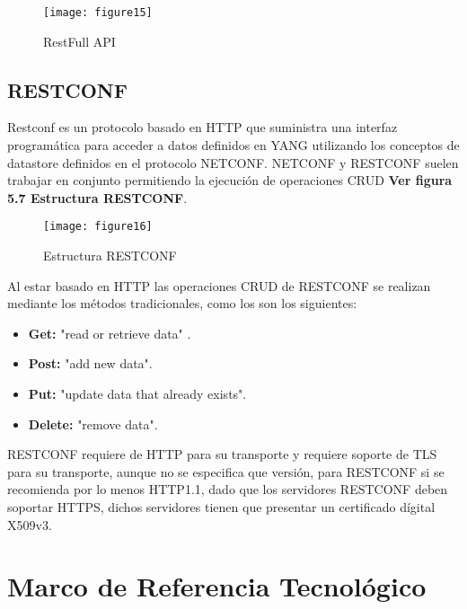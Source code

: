 \begin{figure}[htbp]
  \centering
    {\texttt{[image: figure15]}}%
  \caption{RestFull API}
  \label{fig:fig2subfig}
\end{figure}

\subsection{RESTCONF}
\label{sec:RESTCONF}

Restconf es un protocolo basado en HTTP que suministra una interfaz programática para acceder a datos definidos en YANG utilizando los conceptos de datastore definidos en el protocolo NETCONF.
NETCONF y RESTCONF suelen trabajar en conjunto permitiendo la ejecución de operaciones CRUD \textbf{Ver figura 5.7 Estructura RESTCONF}.
\begin{figure}[htbp]
  \centering
    {\texttt{[image: figure16]}}%
  \caption{Estructura RESTCONF}
  \label{fig:fig2subfig}
\end{figure}
Al estar basado en HTTP las operaciones CRUD de RESTCONF se realizan mediante los métodos tradicionales, como los son los siguientes:
\begin{itemize}
\item\textbf{Get:} "read or retrieve data"	.
\item\textbf{Post:} "add new data".
\item\textbf{Put:} "update data that already exists".
\item\textbf{Delete:} "remove data".
\end{itemize}

RESTCONF requiere de HTTP para su transporte y requiere soporte de TLS para su transporte, aunque no se especifica que versión, para RESTCONF si se recomienda por lo menos HTTP1.1, dado que los servidores RESTCONF deben soportar HTTPS, dichos servidores tienen que presentar un certificado dígital X509v3.

\section{Marco de Referencia Tecnológico}
\label{sec:Marco de referencia tecnológico}

